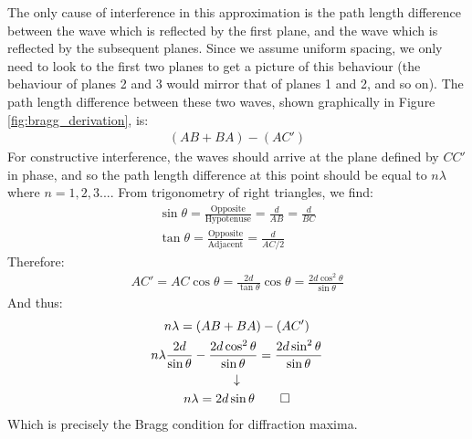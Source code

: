 \documentclass[%
 reprint,
 amsmath,amssymb,
 aps,
 pra,
]{revtex4-1}
\begin{document}
\begin{appendix}
The only cause of interference in this approximation is the path length difference between the wave which is reflected by the first plane, and the wave which is reflected by the subsequent planes. Since we assume uniform spacing, we only need to look to the first two planes to get a picture of this behaviour (the behaviour of planes 2 and 3 would mirror that of planes 1 and 2, and so on). The path length difference between these two waves, shown graphically in Figure \ref{fig:bragg_derivation}, is:
\begin{gather}
	(AB + BA) - (AC') \nonumber
\end{gather}
For constructive interference, the waves should arrive at the plane defined by $CC'$ in phase, and so the path length difference at this point should be equal to $n \lambda$ where $n = 1,2,3...$. From trigonometry of right triangles, we find:
\begin{gather}
	\sin\theta = \frac{\text{Opposite}}{\text{Hypotenuse}} = \frac{d}{AB} = \frac{d}{BC} \nonumber \\
	\tan \theta = \frac{\text{Opposite}}{\text{Adjacent}} = \frac{d}{AC/2} \nonumber 
\end{gather}
Therefore:
\begin{gather}
	AC' = AC\cos\theta = \frac{2d}{\tan\theta}\cos\theta = \frac{2d \cos^2\theta}{\sin\theta} \nonumber
\end{gather}
And thus:
\begin{gather}
n \lambda = (AB + BA) - (AC') \nonumber \\
n\lambda \frac{2d}{\sin \theta} - \frac{2d \cos^2\theta}{\sin\theta} = \frac{2d \sin^2\theta}{\sin\theta} \nonumber \\
\downarrow \nonumber \\
n \lambda = 2d\sin\theta \nonumber \qed
\end{gather}
Which is precisely the Bragg condition for diffraction maxima.


\end{appendix}
\end{document}
